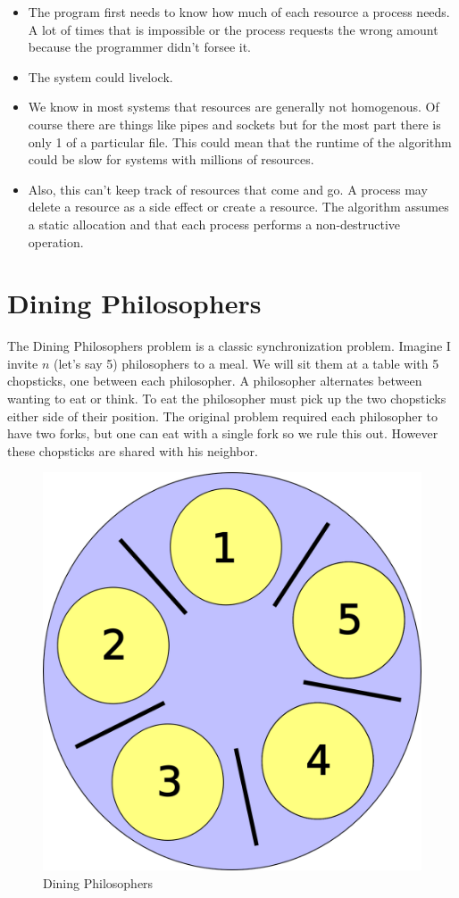 \begin{aside}
\begin{itemize}
\item The program first needs to know how much of each resource a process needs. A lot of times that is impossible or the process requests the wrong amount because the programmer didn't forsee it. 
\item The system could livelock. 
\item We know in most systems that resources are generally not homogenous. Of course there are things like pipes and sockets but for the most part there is only 1 of a particular file. This could mean that the runtime of the algorithm could be slow for systems with millions of resources.
\item Also, this can't keep track of resources that come and go. A process may delete a resource as a side effect or create a resource. The algorithm assumes a static allocation and that each process performs a non-destructive operation.
\end{itemize}
\end{aside}

\section{Dining Philosophers}

The Dining Philosophers problem is a classic synchronization problem. Imagine I invite $n$ (let's say 5) philosophers to a meal. We will sit them at a table with 5 chopsticks, one between each philosopher. A philosopher alternates between wanting to eat or think. To eat the philosopher must pick up the two chopsticks either side of their position. The original problem required each philosopher to have two forks, but one can eat with a single fork so we rule this out. However these chopsticks are shared with his neighbor.

\begin{figure}
  \begin{center}
\includegraphics[width=.2\textwidth]{deadlock/images/5DiningPhilosophers.png}
\end{center}
  \caption{Dining Philosophers}
\end{figure}

